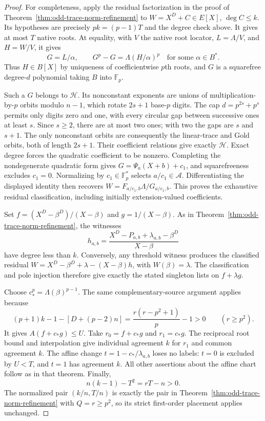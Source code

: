 \begin{proof}
For completeness, apply the residual factorization in the proof of
Theorem~\ref{thm:odd-trace-norm-refinement} to
$W=X^D+C\in E[X]$, $\deg C\le k$. Its hypotheses are precisely
$pk=(p-1)T$ and the degree check above. It gives at most $T$
native roots. At equality, with $V$ the native root locator,
$L=\Lambda/V$, and $H=W/V$, it gives
\[
 G=L/\alpha,\qquad G^p-G=\Lambda(H/\alpha)^p
 \quad\text{for some }\alpha\in B^*.
\]
Thus $H\in B[X]$ by uniqueness of coefficientwise $p$th roots,
and $G$ is a squarefree degree-$d$ polynomial taking $B$ into
$\mathbb F_p$.

Such a $G$ belongs to $\mathcal H$. Its nonconstant exponents
are unions of multiplication-by-$p$ orbits modulo $n-1$, which
rotate $2s+1$ base-$p$ digits. The cap $d=p^{2s}+p^s$ permits
only digits zero and one, with every circular gap between
successive ones at least $s$. Since $s\ge2$, there are at most
two ones; with two the gaps are $s$ and $s+1$. The only
nonconstant orbits are consequently the linear-trace and Gold
orbits, both of length $2s+1$. Their coefficient relations give
exactly $\mathcal H$. Exact degree forces the quadratic
coefficient to be nonzero. Completing the nondegenerate quadratic
form gives $G=\Psi_a(X+b)+c_1$, and squarefreeness excludes
$c_1=0$. Normalizing by $c_1\in\mathbb F_p^*$ selects
$a/c_1\in\mathcal A$. Differentiating the displayed identity
then recovers $W=F_{a/c_1,b}\Lambda/G_{a/c_1,b}$.
This proves the exhaustive residual classification, including
initially extension-valued coefficients.

Set $f=(X^D-\beta^D)/(X-\beta)$ and $g=1/(X-\beta)$.
As in Theorem~\ref{thm:odd-trace-norm-refinement}, the witnesses
\[
 h_{a,b}=\frac{X^D-P_{a,b}+\lambda_{a,b}-\beta^D}{X-\beta}
\]
have degree less than $k$. Conversely, any threshold witness
produces the classified residual
$W=X^D-\beta^D+\lambda-(X-\beta)h$, with $W(\beta)=\lambda$.
The classification and pole injection therefore give exactly the
stated singleton lists on $f+\lambda g$.

Choose $c_*^p=\Lambda(\beta)^{p-1}$. The same complementary-source
argument applies because
\[
 (p+1)k-1-[D+(p-2)n]
 =\frac{r(r-p^2+1)}p-1>0\qquad(r\ge p^2).
\]
It gives $A(f+c_*g)\le U$. Take $r_0=f+c_*g$ and $r_1=c_*g$.
The reciprocal root bound and interpolation give individual
agreement $k$ for $r_1$ and common agreement $k$.
The affine change $t=1-c_*/\lambda_{a,b}$ loses no labels:
$t=0$ is excluded by $U<T$, and $t=1$ has agreement $k$.
All other assertions about the affine chart follow as in that
theorem. Finally,
\[
 n(k-1)-T^2=rT-n>0.
\]
The normalized pair $(k/n,T/n)$ is exactly the pair in
Theorem~\ref{thm:odd-trace-norm-refinement} with $Q=r\ge p^2$,
so its strict first-order placement applies unchanged.
\end{proof}

